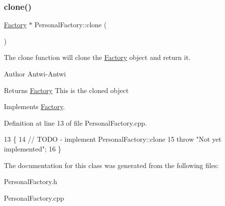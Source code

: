 \subsubsection{\texorpdfstring{clone()}{clone()}}
{\footnotesize\ttfamily \hyperlink{classFactory}{Factory} $\ast$ Personal\+Factory\+::clone (\begin{DoxyParamCaption}{ }\end{DoxyParamCaption})\hspace{0.3cm}{\ttfamily [virtual]}}



The clone function will clone the \hyperlink{classFactory}{Factory} object and return it. 

\begin{DoxyAuthor}{Author}
Antwi-\/\+Antwi 
\end{DoxyAuthor}
\begin{DoxyReturn}{Returns}
\hyperlink{classFactory}{Factory} This is the cloned object 
\end{DoxyReturn}


Implements \hyperlink{classFactory_a00881ec5050751e4b747db5dfd266192}{Factory}.



Definition at line 13 of file Personal\+Factory.\+cpp.


\begin{DoxyCode}
13                                 \{
14     \textcolor{comment}{// TODO - implement PersonalFactory::clone}
15     \textcolor{keywordflow}{throw} \textcolor{stringliteral}{"Not yet implemented"};
16 \}
\end{DoxyCode}


The documentation for this class was generated from the following files\+:\begin{DoxyCompactItemize}
\item 
Personal\+Factory.\+h\item 
Personal\+Factory.\+cpp\end{DoxyCompactItemize}
